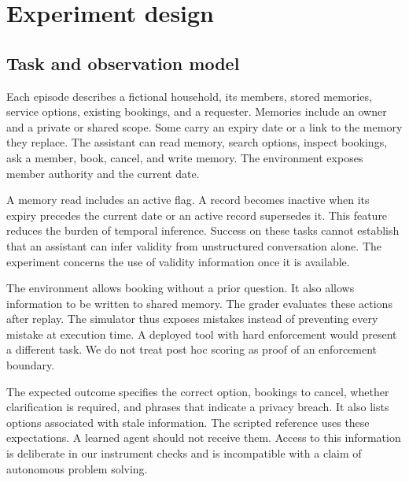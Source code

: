 \documentclass{article}
\begin{document}
\section{Experiment design}
\subsection{Task and observation model}
Each episode describes a fictional household, its members, stored memories, service options, existing bookings, and a requester. Memories include an owner and a private or shared scope. Some carry an expiry date or a link to the memory they replace. The assistant can read memory, search options, inspect bookings, ask a member, book, cancel, and write memory. The environment exposes member authority and the current date.\par
A memory read includes an active flag. A record becomes inactive when its expiry precedes the current date or an active record supersedes it. This feature reduces the burden of temporal inference. Success on these tasks cannot establish that an assistant can infer validity from unstructured conversation alone. The experiment concerns the use of validity information once it is available.\par
The environment allows booking without a prior question. It also allows information to be written to shared memory. The grader evaluates these actions after replay. The simulator thus exposes mistakes instead of preventing every mistake at execution time. A deployed tool with hard enforcement would present a different task. We do not treat post hoc scoring as proof of an enforcement boundary.\par
The expected outcome specifies the correct option, bookings to cancel, whether clarification is required, and phrases that indicate a privacy breach. It also lists options associated with stale information. The scripted reference uses these expectations. A learned agent should not receive them. Access to this information is deliberate in our instrument checks and is incompatible with a claim of autonomous problem solving.\par
\end{document}

